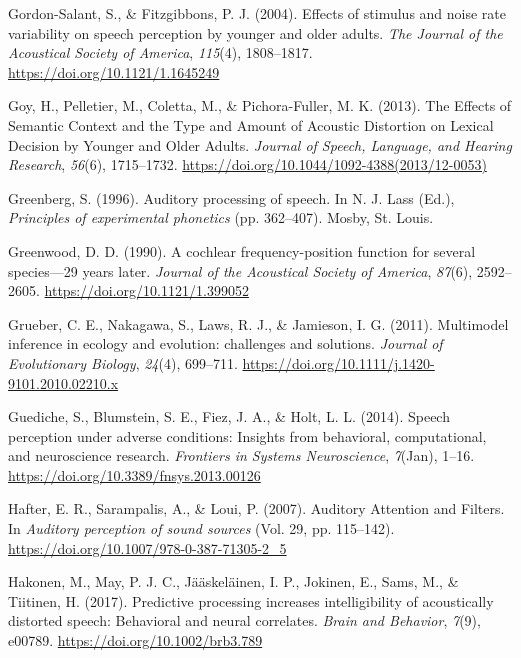 \documentclass[a4paper, nobind]{templates/ociamthesis}
\newlength{\cslhangindent}
\newenvironment{CSLReferences}[2] %
 {%
  \setlength{\parindent}{0pt}
  \ifodd #1
  \let\oldpar\par
  \def\par{\hangindent=\cslhangindent\oldpar}
  \fi
  \setlength{\parskip}{1mm}
  \setlength{\baselineskip}{6mm}
 }%
 {}
\begin{document}
\begin{CSLReferences}{1}{0}
\leavevmode{}%
Gordon-Salant, S., \& Fitzgibbons, P. J. (2004). {Effects of stimulus and noise rate variability on speech perception by younger and older adults}. \emph{The Journal of the Acoustical Society of America}, \emph{115}(4), 1808--1817. \url{https://doi.org/10.1121/1.1645249}

\leavevmode{}%
Goy, H., Pelletier, M., Coletta, M., \& Pichora-Fuller, M. K. (2013). {The Effects of Semantic Context and the Type and Amount of Acoustic Distortion on Lexical Decision by Younger and Older Adults}. \emph{Journal of Speech, Language, and Hearing Research}, \emph{56}(6), 1715--1732. \url{https://doi.org/10.1044/1092-4388(2013/12-0053)}

\leavevmode{}%
Greenberg, S. (1996). Auditory processing of speech. In N. J. Lass (Ed.), \emph{Principles of experimental phonetics} (pp. 362--407). Mosby, St. Louis.

\leavevmode{}%
Greenwood, D. D. (1990). {A cochlear frequency-position function for several species---29 years later}. \emph{Journal of the Acoustical Society of America}, \emph{87}(6), 2592--2605. \url{https://doi.org/10.1121/1.399052}

\leavevmode{}%
Grueber, C. E., Nakagawa, S., Laws, R. J., \& Jamieson, I. G. (2011). Multimodel inference in ecology and evolution: challenges and solutions. \emph{Journal of Evolutionary Biology}, \emph{24}(4), 699--711. \url{https://doi.org/10.1111/j.1420-9101.2010.02210.x}

\leavevmode{}%
Guediche, S., Blumstein, S. E., Fiez, J. A., \& Holt, L. L. (2014). {Speech perception under adverse conditions: Insights from behavioral, computational, and neuroscience research}. \emph{Frontiers in Systems Neuroscience}, \emph{7}(Jan), 1--16. \url{https://doi.org/10.3389/fnsys.2013.00126}

\leavevmode{}%
Hafter, E. R., Sarampalis, A., \& Loui, P. (2007). {Auditory Attention and Filters}. In \emph{Auditory perception of sound sources} (Vol. 29, pp. 115--142). \url{https://doi.org/10.1007/978-0-387-71305-2_5}

\leavevmode{}%
Hakonen, M., May, P. J. C., Jääskeläinen, I. P., Jokinen, E., Sams, M., \& Tiitinen, H. (2017). Predictive processing increases intelligibility of acoustically distorted speech: Behavioral and neural correlates. \emph{Brain and Behavior}, \emph{7}(9), e00789. \url{https://doi.org/10.1002/brb3.789}


\end{CSLReferences}
\end{document}
